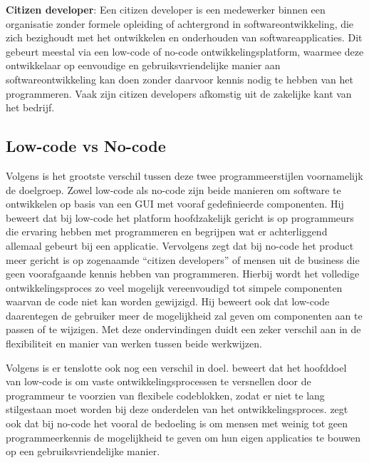 \vspace{\baselineskip}

\textbf{Citizen developer}: Een citizen developer is een medewerker binnen een organisatie zonder formele opleiding of achtergrond in softwareontwikkeling, die zich bezighoudt met het ontwikkelen en onderhouden van softwareapplicaties. Dit gebeurt meestal via een low-code of no-code ontwikkelingsplatform, waarmee deze ontwikkelaar op eenvoudige en gebruiksvriendelijke manier aan softwareontwikkeling kan doen zonder daarvoor kennis nodig te hebben van het programmeren. Vaak zijn citizen developers afkomstig uit de zakelijke kant van het bedrijf. \autocite{Kirvan2023}

\subsection{Low-code vs No-code}
\label{sec:Low-code vs No-code}

Volgens \textcite{Oluwaseyi2024} is het grootste verschil tussen deze twee programmeerstijlen voornamelijk de doelgroep. Zowel low-code als no-code zijn beide manieren om software te ontwikkelen op basis van een GUI met vooraf gedefinieerde componenten. Hij beweert dat bij low-code het platform hoofdzakelijk gericht is op programmeurs die ervaring hebben met programmeren en begrijpen wat er achterliggend allemaal gebeurt bij een applicatie. Vervolgens zegt \textcite{Oluwaseyi2024} dat bij no-code het product meer gericht is op zogenaamde “citizen developers” of mensen uit de business die geen voorafgaande kennis hebben van programmeren. Hierbij wordt het volledige ontwikkelingsproces zo veel mogelijk vereenvoudigd tot simpele componenten waarvan de code niet kan worden gewijzigd. Hij beweert ook dat low-code daarentegen de gebruiker meer de mogelijkheid zal geven om componenten aan te passen of te wijzigen. Met deze ondervindingen duidt \textcite{Oluwaseyi2024} een zeker verschil aan in de flexibiliteit en manier van werken tussen beide werkwijzen.

\vspace{\baselineskip}

Volgens \textcite{ICE2022} is er tenslotte ook nog een verschil in doel. \textcite{ICE2022} beweert dat het hoofddoel van low-code is om vaste ontwikkelingsprocessen te versnellen door de programmeur te voorzien van flexibele codeblokken, zodat er niet te lang stilgestaan moet worden bij deze onderdelen van het ontwikkelingsproces. \textcite{ICE2022} zegt ook dat bij no-code het vooral de bedoeling is om mensen met weinig tot geen programmeerkennis de mogelijkheid te geven om hun eigen applicaties te bouwen op een gebruiksvriendelijke manier.


